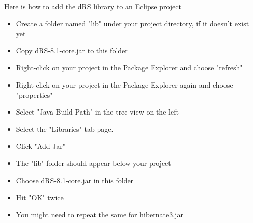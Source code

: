Here is how to add the dRS library to an Eclipse project

\begin{itemize}
\item Create a folder named "lib" under your project directory, if it doesn't exist yet
\item Copy dRS-8.1-core.jar to this folder
\item Right-click on your project in the Package Explorer and choose "refresh"
\item Right-click on your project in the Package Explorer again and choose "properties"
\item Select "Java Build Path" in the tree view on the left
\item Select the "Libraries" tab page.
\item Click "Add Jar"
\item The "lib" folder should appear below your project
\item Choose dRS-8.1-core.jar in this folder
\item Hit "OK" twice
\item You might need to repeat the same for hibernate3.jar
\end{itemize}

